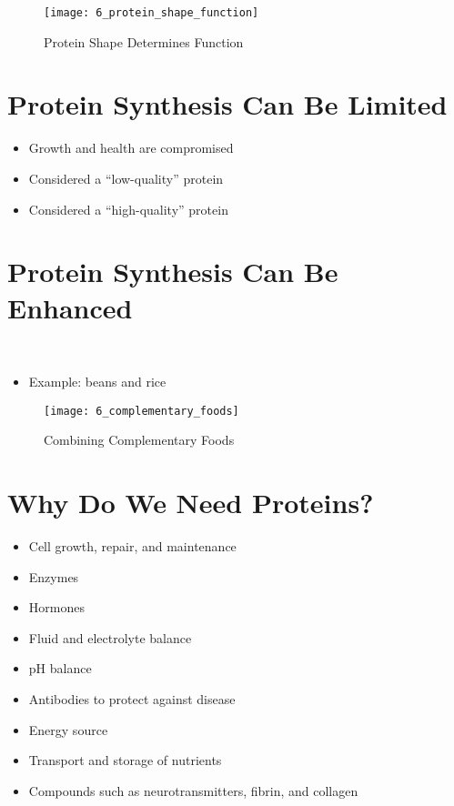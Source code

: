 \documentclass[title={Chapter 6}]{fdsn201notes}
\begin{document}
\begin{figure}[H]
	\centering
	\texttt{[image: 6\_protein\_shape\_function]}
	\caption{Protein Shape Determines Function}
	\label{fig:protein-shape-determines-function}
\end{figure}

\section{Protein Synthesis Can Be Limited}\label{sec:protein-synthesis-can-be-limited}
\begin{itemize}
	\item Growth and health are compromised
	\item Considered a ``low-quality'' protein
\end{itemize}
\begin{itemize}
	\item Considered a ``high-quality'' protein
\end{itemize}

\section{Protein Synthesis Can Be Enhanced}\label{sec:protein-synthesis-can-be-enhanced}
\\

\begin{itemize}
	\item Example: beans and rice
\end{itemize}

\begin{figure}[H]
	\centering
	\texttt{[image: 6\_complementary\_foods]}
	\caption{Combining Complementary Foods}
	\label{fig:combining-complementary-foods}
\end{figure}

\section{Why Do We Need Proteins?}\label{sec:why-do-we-need-proteins?}
\begin{itemize}
	\item Cell growth, repair, and maintenance
	\item Enzymes
	\item Hormones
	\item Fluid and electrolyte balance
	\item pH balance
	\item Antibodies to protect against disease
	\item Energy source
	\item Transport and storage of nutrients
	\item Compounds such as neurotransmitters, fibrin, and collagen
\end{itemize}
\end{document}
